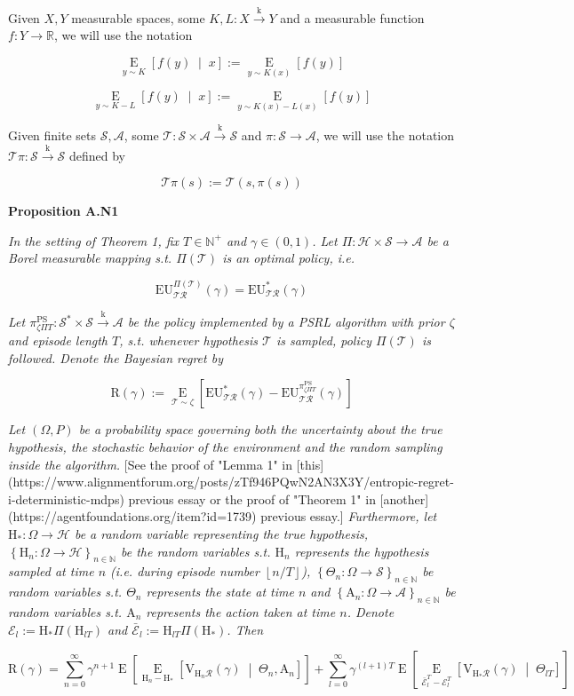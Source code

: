 \documentclass[a4paper]{article}
\newcommand{\Co}[1]{}
\newcommand{\AP}[1]{\left(#1\right)}
\newcommand{\AB}[1]{\left[#1\right]}
\newcommand{\AC}[1]{\left\{#1\right\}}
\newcommand{\ABM}[2]{\left[#1\;\middle\vert\;#2\right]}
\newcommand{\Ea}[2]{\underset{#1}{\operatorname{E}}\AB{#2}}
\newcommand{\CE}[3]{\underset{#1}{\operatorname{E}}\ABM{#2}{#3}}
\newcommand{\Nats}{\mathbb{N}}
\newcommand{\Reals}{\mathbb{R}}
\newcommand{\Floor}[1]{\left\lfloor #1 \right\rfloor}
\newcommand{\K}{\xrightarrow{\mathrm{k}}}
\newcommand{\St}{\mathcal{S}}
\newcommand{\A}{\mathcal{A}}
\newcommand{\R}{\mathcal{R}}
\newcommand{\T}{\mathcal{T}}
\newcommand{\Hy}{\mathcal{H}}
\newcommand{\V}{\mathrm{V}}
\newcommand{\EU}{\mathrm{EU}}
\newcommand{\Reg}{\mathrm{R}}
\newcommand{\PSR}{\text{PS}}
\newcommand{\AT}{\mathrm{A}}
\newcommand{\THy}{\mathrm{H}_*}
\newcommand{\SHy}{\mathrm{H}}
\newcommand{\Ev}{\mathcal{E}}
\begin{document}
Given $X,Y$ measurable spaces, some $K,L:X\K Y$ and a measurable function $f:Y\rightarrow\Reals$, we will use the notation

$$\CE{y\sim K}{f(y)}{x}:=\Ea{y\sim K(x)}{f(y)}$$

$$\CE{y\sim K-L}{f(y)}{x}:=\Ea{y\sim K(x)-L(x)}{f(y)}$$

Given finite sets $\St,\A$, some $\T:\St\times\A\K\St$ and $\pi:\St\rightarrow\A$, we will use the notation $\T\pi:\St\K\St$ defined by

$$\T\pi(s):=\T\AP{s,\pi(s)}$$

\textbf{Proposition A.N1}\Co{b}

\textit{In the setting of Theorem 1, fix $T\in\Nats^+$ and $\gamma\in(0,1)$. Let $\Pi:\Hy\times\St\rightarrow\A$ be a Borel measurable mapping s.t. $\Pi(\T)$ is an optimal policy, i.e.}\Co{i}

$$\EU^{\Pi(\T)}_{\T\R}(\gamma)=\EU^{*}_{\T\R}(\gamma)$$

\textit{Let $\pi_{\zeta\Pi T}^{\PSR}: \St^*\times\St\K\A$ be the policy implemented by a PSRL algorithm with prior $\zeta$ and episode length $T$, s.t. whenever hypothesis $\T$ is sampled, policy $\Pi(\T)$ is followed. Denote the Bayesian regret by}\Co{i}

$$\Reg(\gamma):=\Ea{\T\sim\zeta}{\EU^*_{\T\R}(\gamma)-\EU^{\pi_{\zeta\Pi T}^{\PSR}}_{\T\R}(\gamma)}$$

\textit{Let $(\Omega,P)$ be a probability space governing both the uncertainty about the true hypothesis, the stochastic behavior of the environment and the random sampling inside the algorithm.}\Co{i} [See the proof of "Lemma 1" in [this](https://www.alignmentforum.org/posts/zTf946PQwN2AN3X3Y/entropic-regret-i-deterministic-mdps) previous essay or the proof of "Theorem 1" in [another](https://agentfoundations.org/item?id=1739) previous essay.]\textit{ Furthermore, let $\THy:\Omega\rightarrow\Hy$ be a random variable representing the true hypothesis, $\AC{\SHy_n:\Omega\rightarrow\Hy}_{n\in\Nats}$ be the random variables s.t. $\SHy_n$ represents the hypothesis sampled at time $n$ (i.e. during episode number $\Floor{n/T}$), $\AC{\Theta_n:\Omega\rightarrow\St}_{n\in\Nats}$ be random variables s.t. $\Theta_n$ represents the state at time $n$ and $\AC{\AT_n:\Omega\rightarrow\A}_{n\in\Nats}$ be random variables s.t. $\AT_n$ represents the action taken at time $n$. Denote $\Ev_l:=\SHy_*\Pi\AP{\SHy_{lT}}$ and $\bar{\Ev}_l:=\SHy_{lT}\Pi\AP{\SHy_*}$. Then}\Co{i}

$$\Reg(\gamma)=\sum_{n=0}^\infty\gamma^{n+1}\Ea{}{\CE{\SHy_n-\THy}{\V_{\SHy_n\R}(\gamma)}{\Theta_n,\AT_n}}+\sum_{l=0}^\infty{\gamma^{(l+1)T}}\Ea{}{\CE{\bar{\Ev}_{l}^T-\Ev_{l}^T}{\V_{\SHy_*\R}(\gamma)}{\Theta_{lT}}}$$
\end{document}
